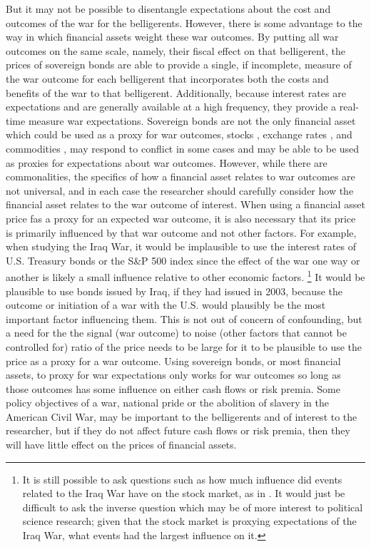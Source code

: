 But it may not be possible to disentangle expectations about the cost and outcomes of the war for the belligerents.
However, there is some advantage to the way in which financial assets weight these war outcomes.
By putting all war outcomes on the same scale, namely, their fiscal effect on that belligerent, the prices of sovereign bonds are able to provide a single, if incomplete, measure of the war outcome for each belligerent that incorporates both the costs and benefits of the war to that belligerent.
Additionally, because interest rates are expectations and are generally available at a high frequency, they provide a real-time measure war expectations.
Sovereign bonds are not the only financial asset which could be used as a proxy for war outcomes, stocks \textcites{ChenSiems2004}{SchneiderTroeger2006}{WolfersZitzewitz2009}, exchange rates \textcites{Hall2004}, and commodities \textcites{WolfersZitzewitz2009}, may respond to conflict in some cases and may be able to be used as proxies for expectations about war outcomes.
However, while there are commonalities, the specifics of how a financial asset relates to war outcomes are not universal, and in each case the researcher should carefully consider how the financial asset relates to the war outcome of interest.
When using a financial asset price fas a proxy for an expected war outcome, it is also necessary that its price is primarily influenced by that war outcome and not other factors.
For example, when studying the Iraq War, it would be implausible to use the interest rates of U.S. Treasury bonds or the S\&P 500 index since the effect of the war one way or another is likely a small influence relative to other economic factors.%
\footnote{
  It is still possible to ask questions such as how much influence did events related to the Iraq War have on the stock market, as in \textcite{WolfersZitzewitz2009}.
  It would just be difficult to ask the inverse question which may be of more interest to political science research; given that the stock market is proxying expectations of the Iraq War, what events had the largest influence on it.
 }
It would be plausible to use bonds issued by Iraq, if they had issued in 2003, because the outcome or initiation of a war with the U.S. would plausibly be the most important factor influencing them.
This is not out of concern of confounding, but a need for the the signal (war outcome) to noise (other factors that cannot be controlled for) ratio of the price needs to be large for it to be plausible to use the price as a proxy for a war outcome.
Using sovereign bonds, or most financial assets, to proxy for war expectations only works for war outcomes so long as those outcomes has some influence on either cash flows or risk premia.
Some policy objectives of a war, \eg{}national pride or the abolition of slavery in the American Civil War, may be important to the belligerents and of interest to the researcher, but if they do not affect future cash flows or risk premia, then they will have little effect on the prices of financial assets.

